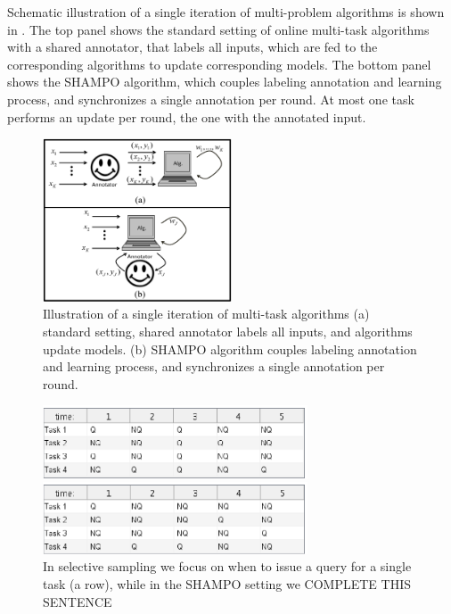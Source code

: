 Schematic illustration of a single iteration of multi-problem algorithms is shown in . The top panel shows the standard
setting of online multi-task algorithms with a shared annotator, that labels all inputs, which are fed to the corresponding algorithms to update corresponding models. The
bottom panel shows the SHAMPO algorithm, which couples labeling
annotation and learning process, and synchronizes a single annotation
per round.  At most one task performs an update per round, the one
with the annotated input.

\begin{figure}
\begin{centering}
\includegraphics[width=0.5\textwidth]{figs/SHAMPO_illustration.eps}
\caption{Illustration of a single iteration of  multi-task algorithms (a) standard setting, shared annotator labels all inputs, and algorithms update models. (b) SHAMPO algorithm couples labeling annotation and learning process, and synchronizes a single annotation per round.}
\label{fig:ilustration}
\end{centering}
\end{figure}

\begin{figure}
\begin{centering}
\includegraphics[width=0.7\textwidth]{figs/table_ss.eps}
\end{centering} 
\begin{centering}
\includegraphics[width=0.7\textwidth]{figs/table_SHAMPO.eps}
\caption{In selective sampling we focus on when to issue a query for a single task (a row), while in the SHAMPO setting we
   COMPLETE THIS SENTENCE  }
\label{fig:ss_vs_SHAMPO}
\end{centering}
\end{figure}

